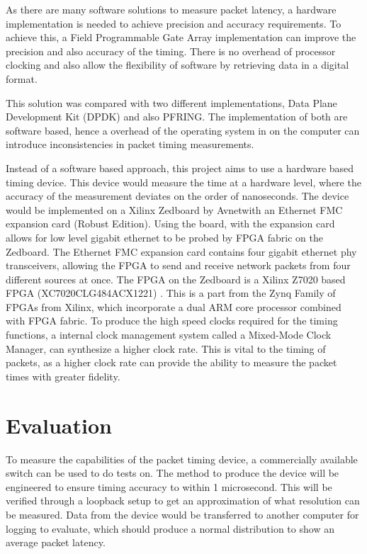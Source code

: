 \par As there are many software solutions to measure packet latency, a hardware implementation is needed to achieve precision and accuracy requirements.
To achieve this, a Field Programmable Gate Array implementation can improve the precision and also accuracy of the timing.
There is no overhead of processor clocking and also allow the flexibility of software by retrieving data in a digital format.

\par This solution was compared with two different implementations, Data Plane Development Kit (DPDK) and also PF\textunderscore RING.
The implementation of both are software based, hence a overhead of the operating system in on the computer can introduce inconsistencies in packet timing measurements.

\par Instead of a software based approach, this project aims to use a hardware based timing device.
This device would measure the time at a hardware level, where the accuracy of the measurement deviates on the order of nanoseconds.
The device would be implemented on a Xilinx Zedboard by Avnet\texttrademark with an Ethernet FMC expansion card (Robust Edition).
Using the board, with the expansion card allows for low level gigabit ethernet to be probed by FPGA fabric on the Zedboard.
The Ethernet FMC expansion card contains four gigabit ethernet phy transceivers, allowing the FPGA to send and receive network packets from four different sources at once.
The FPGA on the Zedboard is a Xilinx Z7020 based FPGA (XC7020CLG484ACX1221) \cite{fpga}.
This is a part from the Zynq Family of FPGAs from Xilinx, which incorporate a dual ARM core processor combined with FPGA fabric.
To produce the high speed clocks required for the timing functions, a internal clock management system called a Mixed-Mode Clock Manager, can synthesize a higher clock rate.
This is vital to the timing of packets, as a higher clock rate can provide the ability to measure the packet times with greater fidelity.

\section{Evaluation}
To measure the capabilities of the packet timing device, a commercially available switch can be used to do tests on.
The method to produce the device will be engineered to ensure timing accuracy to within 1 microsecond.
This will be verified through a loopback setup to get an approximation of what resolution can be measured.
Data from the device would be transferred to another computer for logging to evaluate, which should produce a normal distribution to show an average packet latency.
